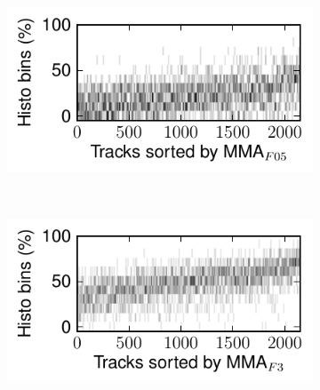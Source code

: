 \documentclass{article}
\begin{document}
\begin{figure}
      \centering
      \begin{subfigure}[b]{0.25\textwidth}
              \includegraphics[width=\textwidth]{plots/histo-F05-trim.pdf}
              \caption{}
              \label{fig:histo-F05-trim}
      \end{subfigure}%
      ~ 
      \begin{subfigure}[b]{0.25\textwidth}
              \includegraphics[width=\textwidth]{plots/histo-F3-trim.pdf}
              \caption{}
              \label{fig:histo-F3-trim}
      \end{subfigure}%
       

\end{figure}
\end{document}
